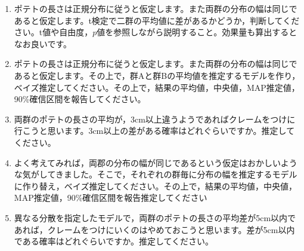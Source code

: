 \begin{enumerate}
	\item ポテトの長さは正規分布に従うと仮定します。また両群の分布の幅は同じであると仮定します。t検定で二群の平均値に差があるかどうか，判断してください。t値や自由度，$p$値を参照しながら説明すること。効果量も算出するとなお良いです。
	\item ポテトの長さは正規分布に従うと仮定します。また両群の分布の幅は同じであると仮定します。その上で，群Aと群Bの平均値を推定するモデルを作り，ベイズ推定してください。その上で，結果の平均値，中央値，MAP推定値，90\%確信区間を報告してください。
	\item 両群のポテトの長さの平均が，3cm以上違うようであればクレームをつけに行こうと思います。3cm以上の差がある確率はどれぐらいですか。推定してください。
	\item よく考えてみれば，両郡の分布の幅が同じであるという仮定はおかしいような気がしてきました。そこで，それぞれの群毎に分布の幅を推定するモデルに作り替え，ベイズ推定してください。その上で，結果の平均値，中央値，MAP推定値，90\%確信区間を報告推定してください
	\item 異なる分散を指定したモデルで，両群のポテトの長さの平均差が5cm以内であれば，クレームをつけにいくのはやめておこうと思います。差が5cm以内である確率はどれぐらいですか。推定してください。
\end{enumerate}
